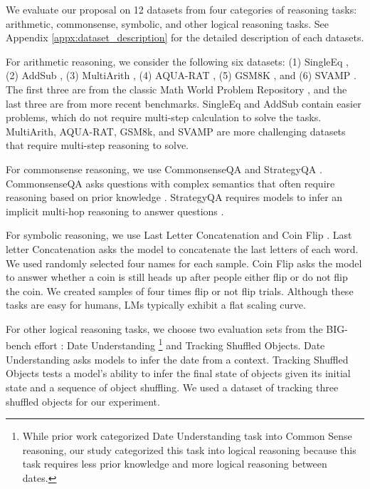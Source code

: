 \documentclass{article}
\begin{document}
We evaluate our proposal on 12 datasets from four categories of reasoning tasks: arithmetic, commonsense, symbolic, and other logical reasoning tasks. 
See Appendix \ref{appx:dataset_description} for the detailed description of each datasets. 

For arithmetic reasoning, we consider the following six datasets: (1) SingleEq \citep{singleeq}, (2) AddSub \citep{addsub}, (3) MultiArith \citep{multiarith}, (4) AQUA-RAT \citep{aqua}, (5) GSM8K \citep{gsm8k}, and (6) SVAMP \citep{svamp}. 
The first three are from the classic Math World Problem Repository \citep{mawps}, and the last three are from more recent benchmarks. 
SingleEq and AddSub contain easier problems, which do not require multi-step calculation to solve the tasks. 
MultiArith, AQUA-RAT, GSM8k, and SVAMP are more challenging datasets that require multi-step reasoning to solve.



For commonsense reasoning, we use CommonsenseQA \citep{commonsenseqa} and StrategyQA \citep{strategyqa}.
CommonsenseQA asks questions with complex semantics that often require reasoning based on prior knowledge \citep{commonsenseqa}. 
StrategyQA requires models to infer an implicit multi-hop reasoning to answer questions \citep{strategyqa}. 

For symbolic reasoning, we use Last Letter Concatenation and Coin Flip \citep{cot_wei}. Last letter Concatenation asks the model to concatenate the last letters of each word. We used randomly selected four names for each sample. Coin Flip asks the model to answer whether a coin is still heads up after people either flip or do not flip the coin.
We created samples of four times flip or not flip trials. 
Although these tasks are easy for humans, LMs typically exhibit a flat scaling curve. 

For other logical reasoning tasks, we choose two evaluation sets from the BIG-bench effort \citep{bigbench}: Date Understanding \footnote{While prior work \citep{cot_wei} categorized Date Understanding task into Common Sense reasoning, our study categorized this task into logical reasoning because this task requires less prior knowledge and more logical reasoning between dates.} and Tracking Shuffled Objects. 
Date Understanding asks models to infer the date from a context. 
Tracking Shuffled Objects tests a model's ability to infer the final state of objects given its initial state and a sequence of object shuffling. We used a dataset of tracking three shuffled objects for our experiment.
\end{document}
